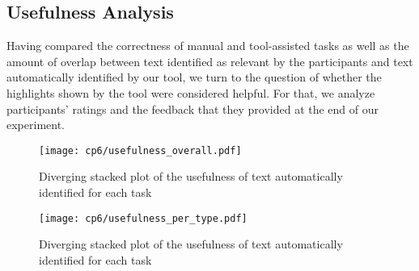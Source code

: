
\clearpage

\subsection{Usefulness Analysis}
\label{cp6:usefulness}


Having compared the correctness of manual and tool-assisted tasks as well 
as the amount of overlap between text identified as relevant by the participants and 
text automatically identified by our tool, we turn to the question of 
whether the highlights shown by the tool were considered helpful. 
For that, we analyze participants' ratings and the feedback that they 
provided at the end of our experiment.






\begin{figure}[h!]
    \centering
    \texttt{[image: cp6/usefulness\_overall.pdf]}
    \caption{Diverging stacked plot of the usefulness of text automatically identified for each task}
    \label{fig:usefulness-by-task}
\end{figure}





\begin{figure}[h!]
    \centering
    \texttt{[image: cp6/usefulness\_per\_type.pdf]}
    \caption{Diverging stacked plot of the usefulness of text automatically identified for each task}
    \label{fig:usefulness-by-artifact-type}
\end{figure}









